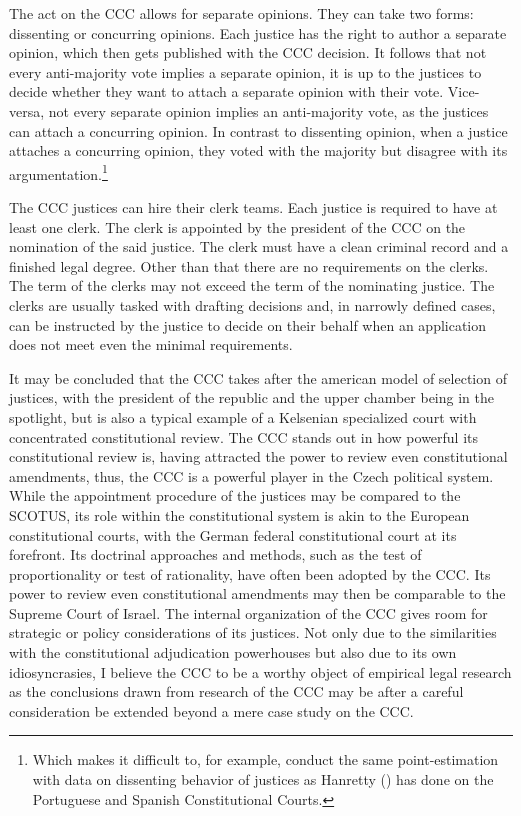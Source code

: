 \documentclass[
  11pt,
]{article}
\begin{document}
The act on the CCC allows for separate opinions. They can take two forms: dissenting or concurring opinions. Each justice has the right to author a separate opinion, which then gets published with the CCC decision. It follows that not every anti-majority vote implies a separate opinion, it is up to the justices to decide whether they want to attach a separate opinion with their vote. Vice-versa, not every separate opinion implies an anti-majority vote, as the justices can attach a concurring opinion. In contrast to dissenting opinion, when a justice attaches a concurring opinion, they voted with the majority but disagree with its argumentation.\footnote{Which makes it difficult to, for example, conduct the same point-estimation with data on dissenting behavior of justices as Hanretty () has done on the Portuguese and Spanish Constitutional Courts.}

The CCC justices can hire their clerk teams. Each justice is required to have at least one clerk. The clerk is appointed by the president of the CCC on the nomination of the said justice. The clerk must have a clean criminal record and a finished legal degree. Other than that there are no requirements on the clerks. The term of the clerks may not exceed the term of the nominating justice. The clerks are usually tasked with drafting decisions and, in narrowly defined cases, can be instructed by the justice to decide on their behalf when an application does not meet even the minimal requirements.

It may be concluded that the CCC takes after the american model of selection of justices, with the president of the republic and the upper chamber being in the spotlight, but is also a typical example of a Kelsenian specialized court with concentrated constitutional review. The CCC stands out in how powerful its constitutional review is, having attracted the power to review even constitutional amendments, thus, the CCC is a powerful player in the Czech political system. While the appointment procedure of the justices may be compared to the SCOTUS, its role within the constitutional system is akin to the European constitutional courts, with the German federal constitutional court at its forefront. Its doctrinal approaches and methods, such as the test of proportionality or test of rationality, have often been adopted by the CCC. Its power to review even constitutional amendments may then be comparable to the Supreme Court of Israel. The internal organization of the CCC gives room for strategic or policy considerations of its justices. Not only due to the similarities with the constitutional adjudication powerhouses but also due to its own idiosyncrasies, I believe the CCC to be a worthy object of empirical legal research as the conclusions drawn from research of the CCC may be after a careful consideration be extended beyond a mere case study on the CCC.
\end{document}
